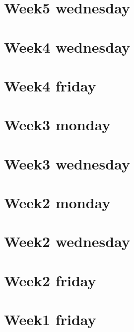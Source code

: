 
\section*{Week5 wednesday}

\vfill
\section*{Week4 wednesday}

\vfill
\section*{Week4 friday}

\vfill
\section*{Week3 monday}

\vfill
\section*{Week3 wednesday}

\vfill
\section*{Week2 monday}

\vfill
\section*{Week2 wednesday}

\vfill
\section*{Week2 friday}

\vfill
\section*{Week1 friday}

\vfill
